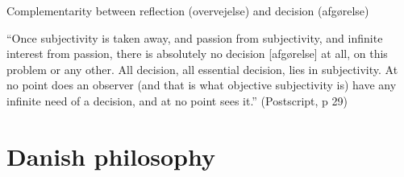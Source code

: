 \documentclass[fleqn]{beamer}
\begin{document}
\begin{frame}{Complementarity between reflection (overvejelse) and
    decision (afgørelse)}

  ``Once subjectivity is taken away, and passion from subjectivity,
  and infinite interest from passion, there is absolutely no decision
  [afgørelse] at all, on this problem or any other. All decision, all
  essential decision, lies in subjectivity. At no point does an
  observer (and that is what objective subjectivity is) have any
  infinite need of a decision, and at no point sees it.'' (Postscript,
  p 29)

\end{frame}

\section{Danish philosophy}
\end{document}
